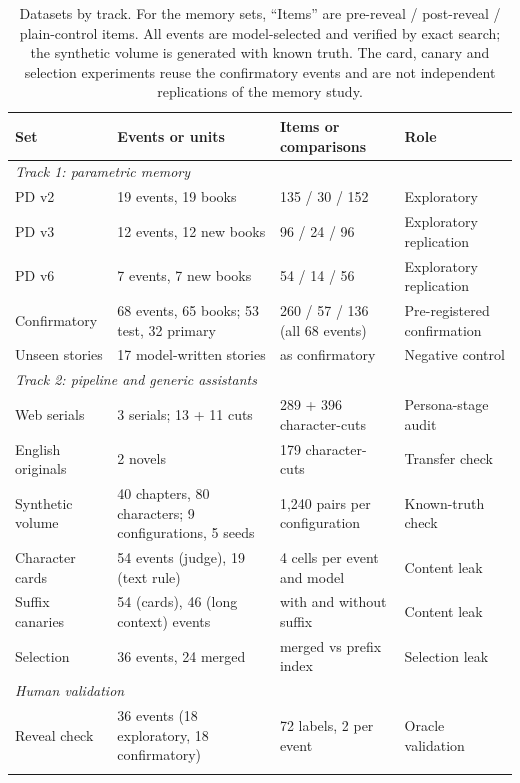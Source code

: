 \documentclass[sn-mathphys]{sn-jnl}%
\theoremstyle{thmstyleone}%
\theoremstyle{thmstyletwo}%
\theoremstyle{thmstylethree}%
\begin{document}
\begin{table}[!t]
\caption{Datasets by track. For the memory sets, ``Items'' are pre-reveal / post-reveal / plain-control items. All events are model-selected and verified by exact search; the synthetic volume is generated with known truth. The card, canary and selection experiments reuse the confirmatory events and are not independent replications of the memory study.}\label{tab:data}
\footnotesize
\begin{tabular*}{\textwidth}{@{\extracolsep\fill}p{2.2cm}p{3.3cm}p{3.0cm}p{2.8cm}}
\toprule
Set & Events or units & Items or comparisons & Role \\
\midrule
\multicolumn{4}{l}{\emph{Track 1: parametric memory}} \\
PD v2 & 19 events, 19 books & 135 / 30 / 152 & Exploratory \\
PD v3 & 12 events, 12 new books & 96 / 24 / 96 & Exploratory replication \\
PD v6 & 7 events, 7 new books & 54 / 14 / 56 & Exploratory replication \\
Confirmatory & 68 events, 65 books; 53 test, 32 primary & 260 / 57 / 136 (all 68 events) & Pre-registered confirmation \\
Unseen stories & 17 model-written stories & as confirmatory & Negative control \\
\midrule
\multicolumn{4}{l}{\emph{Track 2: pipeline and generic assistants}} \\
Web serials & 3 serials; 13 + 11 cuts & 289 + 396 character-cuts & Persona-stage audit \\
English originals & 2 novels & 179 character-cuts & Transfer check \\
Synthetic volume & 40 chapters, 80 characters; 9 configurations, 5 seeds & 1,240 pairs per configuration & Known-truth check \\
Character cards & 54 events (judge), 19 (text rule) & 4 cells per event and model & Content leak \\
Suffix canaries & 54 (cards), 46 (long context) events & with and without suffix & Content leak \\
Selection & 36 events, 24 merged & merged vs prefix index & Selection leak \\
\midrule
\multicolumn{4}{l}{\emph{Human validation}} \\
Reveal check & 36 events (18 exploratory, 18 confirmatory) & 72 labels, 2 per event & Oracle validation \\
\botrule
\end{tabular*}
\end{table}
\end{document}

